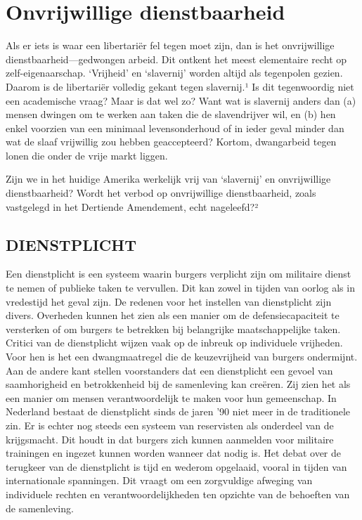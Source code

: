 \documentclass[
  a5paper,
  smalldemyvopaper,10pt,twoside,onecolumn,openright,extrafontsizes,hidelinks]{memoir}
\begin{document}

\chapter{Onvrijwillige
dienstbaarheid}\label{onvrijwillige-dienstbaarheid}

Als er iets is waar een libertariër fel tegen moet zijn, dan is het
onvrijwillige dienstbaarheid---gedwongen arbeid. Dit ontkent het meest
elementaire recht op zelf-eigenaarschap. `Vrijheid' en `slavernij'
worden altijd als tegenpolen gezien. Daarom is de libertariër volledig
gekant tegen slavernij.¹ Is dit tegenwoordig niet een academische vraag?
Maar is dat wel zo? Want wat is slavernij anders dan (a) mensen dwingen
om te werken aan taken die de slavendrijver wil, en (b) hen enkel
voorzien van een minimaal levensonderhoud of in ieder geval minder dan
wat de slaaf vrijwillig zou hebben geaccepteerd? Kortom, dwangarbeid
tegen lonen die onder de vrije markt liggen.

Zijn we in het huidige Amerika werkelijk vrij van `slavernij' en
onvrijwillige dienstbaarheid? Wordt het verbod op onvrijwillige
dienstbaarheid, zoals vastgelegd in het Dertiende Amendement, echt
nageleefd?²

\section{DIENSTPLICHT}\label{dienstplicht}

Een dienstplicht is een systeem waarin burgers verplicht zijn om
militaire dienst te nemen of publieke taken te vervullen. Dit kan zowel
in tijden van oorlog als in vredestijd het geval zijn. De redenen voor
het instellen van dienstplicht zijn divers. Overheden kunnen het zien
als een manier om de defensiecapaciteit te versterken of om burgers te
betrekken bij belangrijke maatschappelijke taken. Critici van de
dienstplicht wijzen vaak op de inbreuk op individuele vrijheden. Voor
hen is het een dwangmaatregel die de keuzevrijheid van burgers
ondermijnt. Aan de andere kant stellen voorstanders dat een dienstplicht
een gevoel van saamhorigheid en betrokkenheid bij de samenleving kan
creëren. Zij zien het als een manier om mensen verantwoordelijk te maken
voor hun gemeenschap. In Nederland bestaat de dienstplicht sinds de
jaren '90 niet meer in de traditionele zin. Er is echter nog steeds een
systeem van reservisten als onderdeel van de krijgsmacht. Dit houdt in
dat burgers zich kunnen aanmelden voor militaire trainingen en ingezet
kunnen worden wanneer dat nodig is. Het debat over de terugkeer van de
dienstplicht is tijd en wederom opgelaaid, vooral in tijden van
internationale spanningen. Dit vraagt om een zorgvuldige afweging van
individuele rechten en verantwoordelijkheden ten opzichte van de
behoeften van de samenleving.
\end{document}
